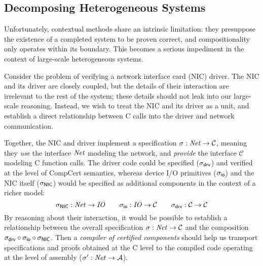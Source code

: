 \subsection{Decomposing Heterogeneous Systems}
\label{ssec:intro-dhs}

Unfortunately, contextual methods share an intrinsic limitation: they
presuppose the existence of a completed system to be proven correct,
and compositionality only operates within its boundary.  This becomes
a serious impediment in the context of large-scale heterogeneous
systems.

\begin{example} \label{ex:nicdriver} 
Consider the problem of verifying a network interface card (NIC)
driver.  The NIC and its driver are closely coupled, but the details
of their interaction are irrelevant to the rest of the system; these
details should not leak into our large-scale reasoning.  Instead, we
wish to treat the NIC and its driver as a unit, and establish a direct
relationship between C calls into the driver and network
communication.

Together, the NIC and driver implement a specification
$\sigma : \mathit{Net} \rightarrow \mathcal{C}$, meaning they \emph{use}
the interface $\mathit{Net}$ modeling the network, and \emph{provide} the
interface $\mathcal{C}$ modeling C function calls.
The driver code could be specified ($\sigma_{ \mathsf{drv} }$) and verified at
the level of CompCert semantics, whereas device I/O primitives
($\sigma_{ \mathsf{io} }$) and the NIC itself ($\sigma_{ \mathsf{NIC} }$) would be
specified as additional components in the context of a richer model:
\[
  \sigma_{ \mathsf{NIC} } : \mathit{Net} \rightarrow \mathit{IO}
  \qquad
  \sigma_{ \mathsf{io} } : \mathit{IO} \rightarrow \mathcal{C}
  \qquad
  \sigma_{ \mathsf{drv} } : \mathcal{C} \rightarrow \mathcal{C}
\]
By reasoning about their interaction, it would be possible to
establish a relationship between the overall specification $\sigma :
\mathit{Net} \rightarrow \mathcal{C}$ and the composition $\sigma_{ \mathsf{drv} }
\circ \sigma_{ \mathsf{io} } \circ \sigma_{ \mathsf{NIC} }$.  Then a \emph{compiler of
certified components} should help us transport specifications and
proofs obtained at the C level to
the compiled code operating at the level of assembly ($\sigma' :
\mathit{Net} \rightarrow \mathcal{A}$).
\end{example}

